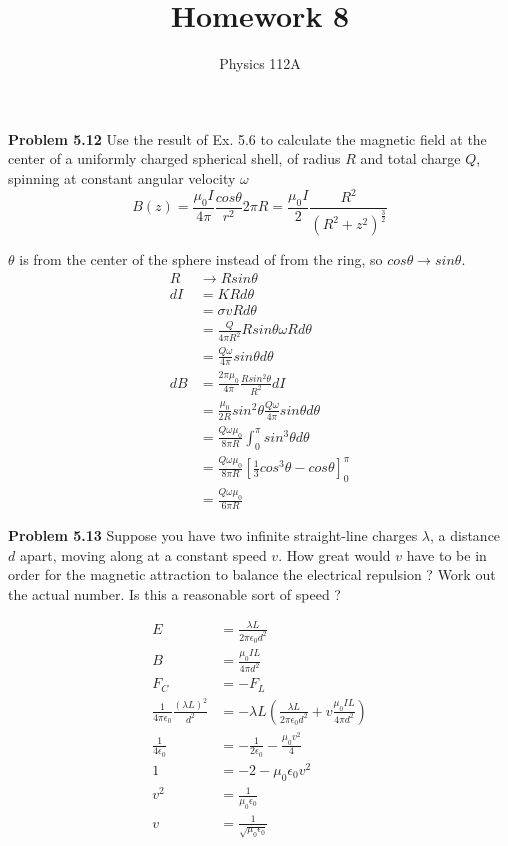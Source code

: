 \documentclass{article}
\title{Homework 8}
\author{Physics 112A}
\date{}
\begin{document}
\maketitle

\textbf{Problem 5.12}
Use the result of Ex. 5.6 to calculate the magnetic field at the center of a uniformly charged spherical shell, of radius $R$ and total charge $Q$, spinning at constant angular velocity $\omega$
$$B(z) = \frac{\mu_0 I}{4 \pi} \frac{cos\theta}{r^2} 2 \pi R = \frac{\mu_0 I}{2} \frac{R^2}{(R^2 + z^2)^{\frac{3}{2}}}$$

$\theta$ is from the center of the sphere instead of from the ring, so $cos\theta \rightarrow sin\theta$.
\begin{equation*}
\begin{split}
	R & \rightarrow R sin\theta \\
	dI & = K R d\theta \\
	& = \sigma v R d\theta \\
	& = \frac{Q}{4 \pi R^2} R sin\theta \omega R d\theta \\
	& = \frac{Q \omega}{4 \pi} sin\theta d\theta \\
	dB & = \frac{2 \pi \mu_0}{4 \pi} \frac{R sin^2\theta}{R^2} dI \\
	& = \frac{\mu_0}{2 R} sin^2\theta \frac{Q \omega}{4 \pi} sin\theta d\theta \\
	& = \frac{Q \omega \mu_0}{8 \pi R} \int_0^\pi sin^3\theta d\theta \\
	& = \frac{Q \omega \mu_0}{8 \pi R} [\frac{1}{3} cos^3\theta - cos\theta]_0^\pi \\
	& = \boxed{\frac{Q \omega \mu_0}{6 \pi R}}
\end{split}
\end{equation*}

\textbf{Problem 5.13}
Suppose you have two infinite straight-line charges $\lambda$, a distance $d$ apart, moving along at a constant speed $v$.
How great would $v$ have to be in order for the magnetic attraction to balance the electrical repulsion ?
Work out the actual number.
Is this a reasonable sort of speed ?

\begin{equation*}
\begin{split}
	E & = \frac{\lambda L}{2 \pi \epsilon_0 d^2} \\
	B & = \frac{\mu_0 I L}{4 \pi d^2} \\
	F_C & = - F_L \\
	\frac{1}{4 \pi \epsilon_0} \frac{(\lambda L)^2}{d^2} & = - \lambda L (\frac{\lambda L}{2 \pi \epsilon_0 d^2} + v \frac{\mu_0 I L}{4 \pi d^2}) \\
	\frac{1}{4 \epsilon_0} & = - \frac{1}{2 \epsilon_0} - \frac{\mu_0 v^2}{4} \\
	1 & = - 2 - \mu_0 \epsilon_0 v^2 \\
	 v^2 & = \frac{1}{\mu_0 \epsilon_0} \\
	 v & = \boxed{\frac{1}{\sqrt{\mu_0 \epsilon_0}}}
\end{split}
\end{equation*}
\end{document}
